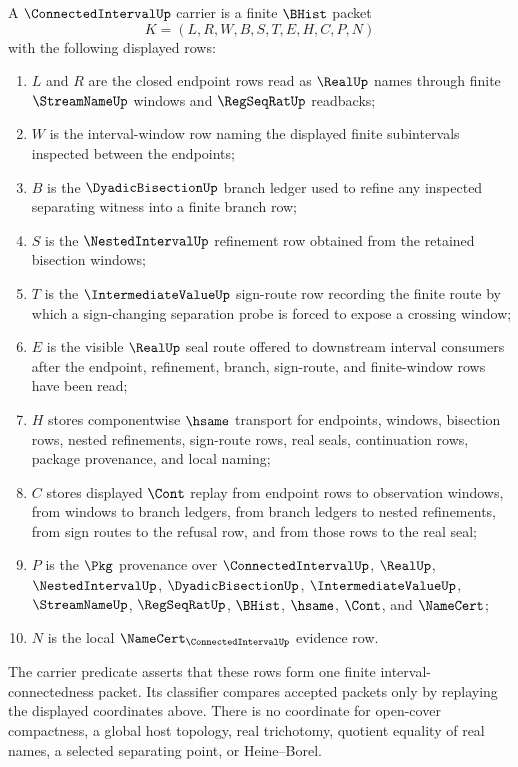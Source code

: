 \begin{definition}
\label{def:connected-interval-carrier}
A $\ConnectedIntervalUp$ carrier is a finite $\BHist$ packet
$$
K=(L,R,W,B,S,T,E,H,C,P,N)
$$
with the following displayed rows:
\begin{enumerate}
\item $L$ and $R$ are the closed endpoint rows read as $\RealUp$ names through finite $\StreamNameUp$ windows and $\RegSeqRatUp$ readbacks;
\item $W$ is the interval-window row naming the displayed finite subintervals inspected between the endpoints;
\item $B$ is the $\DyadicBisectionUp$ branch ledger used to refine any inspected separating witness into a finite branch row;
\item $S$ is the $\NestedIntervalUp$ refinement row obtained from the retained bisection windows;
\item $T$ is the $\IntermediateValueUp$ sign-route row recording the finite route by which a sign-changing separation probe is forced to expose a crossing window;
\item $E$ is the visible $\RealUp$ seal route offered to downstream interval consumers after the endpoint, refinement, branch, sign-route, and finite-window rows have been read;
\item $H$ stores componentwise $\hsame$ transport for endpoints, windows, bisection rows, nested refinements, sign-route rows, real seals, continuation rows, package provenance, and local naming;
\item $C$ stores displayed $\Cont$ replay from endpoint rows to observation windows, from windows to branch ledgers, from branch ledgers to nested refinements, from sign routes to the refusal row, and from those rows to the real seal;
\item $P$ is the $\Pkg$ provenance over $\ConnectedIntervalUp$, $\RealUp$, $\NestedIntervalUp$, $\DyadicBisectionUp$, $\IntermediateValueUp$, $\StreamNameUp$, $\RegSeqRatUp$, $\BHist$, $\hsame$, $\Cont$, and $\NameCert$;
\item $N$ is the local $\NameCert_{\ConnectedIntervalUp}$ evidence row.
\end{enumerate}
The carrier predicate asserts that these rows form one finite interval-connectedness packet. Its classifier compares accepted packets only by replaying the displayed coordinates above. There is no coordinate for open-cover compactness, a global host topology, real trichotomy, quotient equality of real names, a selected separating point, or Heine--Borel.
\end{definition}

